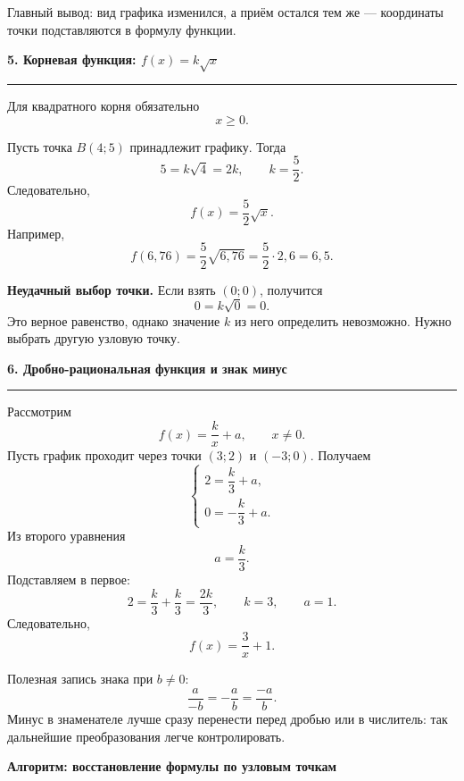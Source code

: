\documentclass[a4paper,12pt]{article}
\newcommand{\topic}[1]{%
  \Needspace{7\baselineskip}%
  \vspace{0.45em}%
  {\Large\bfseries\color{darkaccent} #1}\par
  \vspace{0.2em}%
  {\color{accent}\rule{\linewidth}{0.7pt}}\par
  \vspace{0.35em}%
}
\begin{document}
Главный вывод: вид графика изменился, а приём остался тем же --- координаты точки подставляются в формулу функции.

\topic{5. Корневая функция: $f(x)=k\sqrt{x}$}

Для квадратного корня обязательно
\[
\boxed{x\ge0}.
\]

Пусть точка $B(4;5)$ принадлежит графику. Тогда
\[
5=k\sqrt{4}=2k,
\qquad
k=\frac52.
\]
Следовательно,
\[
\boxed{f(x)=\frac52\sqrt{x}}.
\]
Например,
\[
f(6{,}76)=\frac52\sqrt{6{,}76}
=\frac52\cdot2{,}6
=6{,}5.
\]

\textbf{Неудачный выбор точки.} Если взять $(0;0)$, получится
\[
0=k\sqrt0=0.
\]
Это верное равенство, однако значение $k$ из него определить невозможно. Нужно выбрать другую узловую точку.

\topic{6. Дробно-рациональная функция и знак минус}

Рассмотрим
\[
f(x)=\frac{k}{x}+a,
\qquad
\boxed{x\ne0}.
\]
Пусть график проходит через точки $(3;2)$ и $(-3;0)$. Получаем
\[
\begin{cases}
2=\dfrac{k}{3}+a,\\[1mm]
0=-\dfrac{k}{3}+a.
\end{cases}
\]
Из второго уравнения
\[
a=\frac{k}{3}.
\]
Подставляем в первое:
\[
2=\frac{k}{3}+\frac{k}{3}
=\frac{2k}{3},
\qquad
k=3,
\qquad
a=1.
\]
Следовательно,
\[
\boxed{f(x)=\frac{3}{x}+1}.
\]

Полезная запись знака при $b\ne0$:
\[
\boxed{\frac{a}{-b}=-\frac{a}{b}=\frac{-a}{b}}.
\]
Минус в знаменателе лучше сразу перенести перед дробью или в числитель: так дальнейшие преобразования легче контролировать.

\clearpage

\thispagestyle{fancy}

\begin{center}
{\Large\bfseries\color{darkaccent}
Алгоритм: восстановление формулы по узловым точкам}
\end{center}

\vspace{0.65cm}
\end{document}

